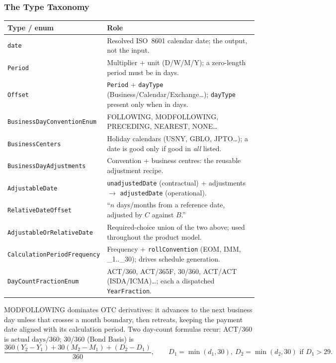 \subsubsection{The Type Taxonomy}
\label{sec:cdm-date-types}

\begin{center}\small
\begin{tabular}{@{}l >{\raggedright\arraybackslash}p{}@{}}
\toprule
\textbf{Type / enum} & \textbf{Role} \\
\midrule
\texttt{date} & Resolved ISO~8601 calendar date; the output, not the input. \\
\texttt{Period} & Multiplier + unit (D/W/M/Y); a zero-length period must be in days. \\
\texttt{Offset} & \texttt{Period} + \texttt{dayType} (Business/Calendar/Exchange\ldots); \texttt{dayType} present only when in days. \\
\texttt{BusinessDayConventionEnum} & FOLLOWING, MODFOLLOWING, PRECEDING, NEAREST, NONE\ldots \\
\texttt{BusinessCenters} & Holiday calendars (USNY, GBLO, JPTO\ldots); a date is good only if good in \emph{all} listed. \\
\texttt{BusinessDayAdjustments} & Convention + business centres: the reusable adjustment recipe. \\
\texttt{AdjustableDate} & \texttt{unadjustedDate} (contractual) + adjustments $\to$ \texttt{adjustedDate} (operational). \\
\texttt{RelativeDateOffset} & ``$n$ days/months from a reference date, adjusted by $C$ against $B$.'' \\
\texttt{AdjustableOrRelativeDate} & Required-choice union of the two above; used throughout the product model. \\
\texttt{CalculationPeriodFrequency} & Frequency + \texttt{rollConvention} (EOM, IMM, \_1..\_30); drives schedule generation. \\
\texttt{DayCountFractionEnum} & ACT/360, ACT/365F, 30/360, ACT/ACT (ISDA/ICMA)\ldots; each a dispatched \texttt{YearFraction}. \\
\bottomrule
\end{tabular}
\end{center}

\noindent MODFOLLOWING dominates OTC derivatives: it advances to the next business day unless that crosses a month boundary, then retreats, keeping the payment date aligned with its calculation period. Two day-count formulas recur: ACT/360 is $\text{actual days}/360$; 30/360 (Bond Basis) is
\[
\frac{360(Y_2-Y_1)+30(M_2-M_1)+(D_2-D_1)}{360},\qquad D_1=\min(d_1,30),\ D_2=\min(d_2,30)\text{ if }D_1>29.
\]

